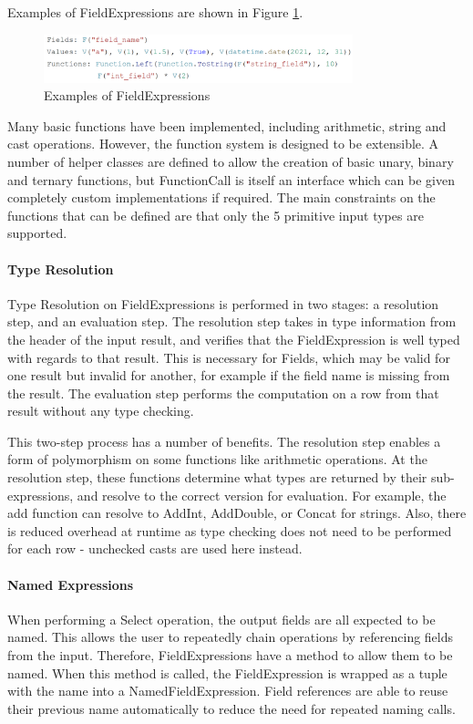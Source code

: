 Examples of FieldExpressions are shown in Figure \ref{fig:field-expressions-examples}.

\begin{figure}[h]
	\centering
	\includegraphics[width=0.8\textwidth]{chapters/diagrams/implementation/field-expressions-examples}
	\caption{Examples of FieldExpressions}
	\label{fig:field-expressions-examples}
\end{figure}

Many basic functions have been implemented, including arithmetic, string and cast operations. However, the function system is designed to be extensible. A number of helper classes are defined to allow the creation of basic unary, binary and ternary functions, but FunctionCall is itself an interface which can be given completely custom implementations if required. The main constraints on the functions that can be defined are that only the 5 primitive input types are supported.

\paragraph{Type Resolution} 
Type Resolution on FieldExpressions is performed in two stages: a resolution step, and an evaluation step. The resolution step takes in type information from the header of the input result, and verifies that the FieldExpression is well typed with regards to that result. This is necessary for Fields, which may be valid for one result but invalid for another, for example if the field name is missing from the result. The evaluation step performs the computation on a row from that result without any type checking. 

This two-step process has a number of benefits. The resolution step enables a form of polymorphism on some functions like arithmetic operations. At the resolution step, these functions determine what types are returned by their sub-expressions, and resolve to the correct version for evaluation. For example, the add function can resolve to AddInt, AddDouble, or Concat for strings. Also, there is reduced overhead at runtime as type checking does not need to be performed for each row - unchecked casts are used here instead.

\paragraph{Named Expressions}
When performing a Select operation, the output fields are all expected to be named. This allows the user to repeatedly chain operations by referencing fields from the input. Therefore, FieldExpressions have a method to allow them to be named. When this method is called, the FieldExpression is wrapped as a tuple with the name into a NamedFieldExpression. Field references are able to reuse their previous name automatically to reduce the need for repeated naming calls. 

